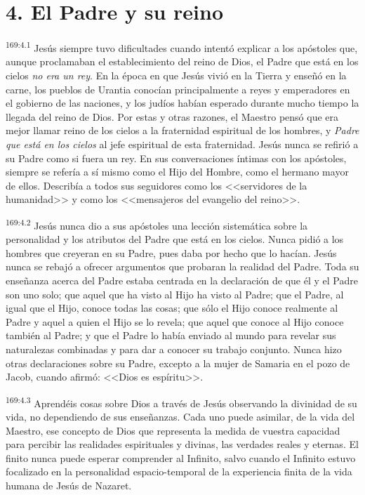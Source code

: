 \section*{4. El Padre y su reino}
\par 
\textsuperscript{169:4.1} Jesús siempre tuvo dificultades cuando intentó explicar a los apóstoles que, aunque proclamaban el establecimiento del reino de Dios, el Padre que está en los cielos \textit{no era un rey}. En la época en que Jesús vivió en la Tierra y enseñó en la carne, los pueblos de Urantia conocían principalmente a reyes y emperadores en el gobierno de las naciones, y los judíos habían esperado durante mucho tiempo la llegada del reino de Dios. Por estas y otras razones, el Maestro pensó que era mejor llamar reino de los cielos a la fraternidad espiritual de los hombres, y \textit{Padre que está en los cielos} al jefe espiritual de esta fraternidad. Jesús nunca se refirió a su Padre como si fuera un rey. En sus conversaciones íntimas con los apóstoles, siempre se refería a sí mismo como el Hijo del Hombre, como el hermano mayor de ellos. Describía a todos sus seguidores como los <<servidores de la humanidad>> y como los <<mensajeros del evangelio del reino>>.

\par 
\textsuperscript{169:4.2} Jesús nunca dio a sus apóstoles una lección sistemática sobre la personalidad y los atributos del Padre que está en los cielos. Nunca pidió a los hombres que creyeran en su Padre, pues daba por hecho que lo hacían. Jesús nunca se rebajó a ofrecer argumentos que probaran la realidad del Padre. Toda su enseñanza acerca del Padre estaba centrada en la declaración de que él y el Padre son uno solo; que aquel que ha visto al Hijo ha visto al Padre; que el Padre, al igual que el Hijo, conoce todas las cosas; que sólo el Hijo conoce realmente al Padre y aquel a quien el Hijo se lo revela; que aquel que conoce al Hijo conoce también al Padre; y que el Padre lo había enviado al mundo para revelar sus naturalezas combinadas y para dar a conocer su trabajo conjunto. Nunca hizo otras declaraciones sobre su Padre, excepto a la mujer de Samaria en el pozo de Jacob, cuando afirmó: <<Dios es espíritu>>.

\par 
\textsuperscript{169:4.3} Aprendéis cosas sobre Dios a través de Jesús observando la divinidad de su vida, no dependiendo de sus enseñanzas. Cada uno puede asimilar, de la vida del Maestro, ese concepto de Dios que representa la medida de vuestra capacidad para percibir las realidades espirituales y divinas, las verdades reales y eternas. El finito nunca puede esperar comprender al Infinito, salvo cuando el Infinito estuvo focalizado en la personalidad espacio-temporal de la experiencia finita de la vida humana de Jesús de Nazaret.

